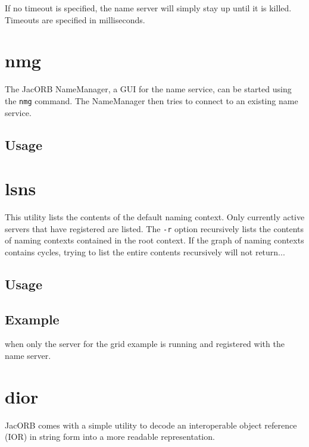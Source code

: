 If no timeout is specified, the name server will simply stay up until
it is killed. Timeouts are specified in milliseconds.

\section{nmg}

The JacORB  NameManager, a  GUI for the  name service, can  be started
using the {\tt nmg} command.  The NameManager then tries to connect to
an existing name service.

\subsection*{Usage}


\section{lsns}

This utility  lists the contents  of the default naming  context. Only
currently active servers that have registered are listed. The {\tt -r}
option recursively lists the  contents of naming contexts contained in
the root  context. If  the graph of  naming contexts  contains cycles,
trying to list the entire contents recursively will not return...

\subsection*{Usage}



\subsection*{Example}


when only the server for the grid example is running and registered
with the name server.


\section{dior}

JacORB comes with a simple utility to decode an interoperable object reference
(IOR) in string form into a more readable representation.

